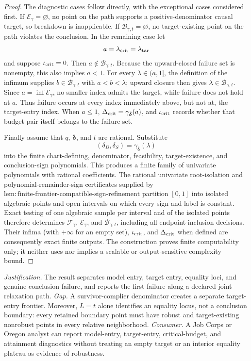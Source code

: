 \documentclass{article}
\begin{document}
\begin{proof}
The diagnostic cases follow directly, with the exceptional cases considered first.  If \(\mathcal E_\gamma=\varnothing\), no point on the path supports a positive-denominator causal target, so breakdown is inapplicable.  If \(\mathcal B_{\gamma,t}=\varnothing\), no target-existing point on the path violates the conclusion.  In the remaining case let
\[
 a=\lambda_{\rm crit}=\lambda_{\rm tar}
\]
and suppose \(\iota_{\rm crit}=0\).  Then \(a\notin\mathcal B_{\gamma,t}\).  Because the upward-closed failure set is nonempty, this also implies \(a<1\).  For every \(\lambda\in(a,1]\), the definition of the infimum supplies \(b\in\mathcal B_{\gamma,t}\) with \(a<b<\lambda\); upward closure then gives \(\lambda\in\mathcal B_{\gamma,t}\).  Since \(a=\inf\mathcal E_\gamma\), no smaller index admits the target, while failure does not hold at \(a\).  Thus failure occurs at every index immediately above, but not at, the target-entry index.  When \(a\leq1\), \(\Delta_{\rm crit}=\gamma_{\bar{\boldsymbol\delta}}(a)\), and \(\iota_{\rm crit}\) records whether that budget pair itself belongs to the failure set.

Finally assume that \(q\), \(\bar{\boldsymbol\delta}\), and \(t\) are rational.  Substitute
\[
 (\delta_D,\delta_S)
 =\gamma_{\bar{\boldsymbol\delta}}(\lambda)
\]
into the finite chart-defining, denominator, feasibility, target-existence, and conclusion-sign polynomials.  This produces a finite family of univariate polynomials with rational coefficients.  The rational univariate root-isolation and polynomial-remainder-sign certificates supplied by \(\mathrm{lem:finite\text{-}frontier\text{-}compatible\text{-}sign\text{-}refinement}\) partition \([0,1]\) into isolated algebraic points and open intervals on which every sign and label is constant.  Exact testing of one algebraic sample per interval and of the isolated points therefore determines \(\mathcal F_\gamma\), \(\mathcal E_\gamma\), and \(\mathcal B_{\gamma,t}\), including all endpoint-inclusion decisions.  Their infima (with \(+\infty\) for an empty set), \(\iota_{\rm crit}\), and \(\Delta_{\rm crit}\) when defined are consequently exact finite outputs.  The construction proves finite computability only; it neither uses nor implies a scalable or output-sensitive complexity bound.
\end{proof}
\par\smallskip\noindent \textit{Justification.} The result separates model entry, target entry, equality loci, and genuine conclusion failure, and reports the first failure along a declared joint-relaxation path. \textit{Gap.} A survivor-complier denominator creates a separate target-entry frontier. Moreover, \(L=t\) alone identifies an equality locus, not a conclusion boundary: every retained boundary point must have robust and target-existing nonrobust points in every relative neighborhood. \textit{Consumer.} A Job Corps or Oregon analyst can report model-entry, target-entry, critical-budget, and attainment diagnostics without treating an empty target or an interior equality plateau as evidence of robustness.
\end{document}
